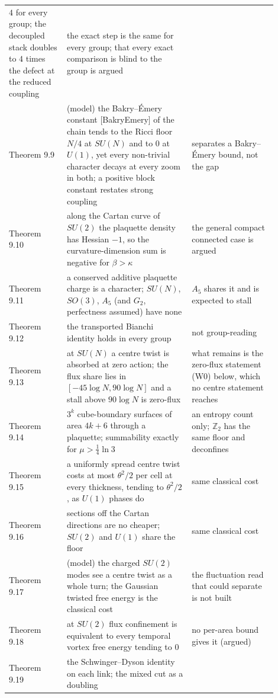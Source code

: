 \documentclass[10pt,letterpaper,twocolumn]{article}
\begin{document}
\begin{center}
{\begin{xtabular}{L{0.194\linewidth}L{0.414\linewidth}L{0.289\linewidth}}
\(4\) for every group; the decoupled stack doubles to \(4\) times the
defect at the reduced coupling & the exact step is the same for every group; that every exact comparison
is blind to the group is argued \\
Theorem 9.9 & (model) the Bakry--Émery constant {[}BakryEmery{]} of the chain tends to
the Ricci floor \(N/4\) at \(SU(N)\) and to \(0\) at \(U(1)\), yet every
non-trivial character decays at every zoom in both; a positive block
constant restates strong coupling & separates a Bakry--Émery bound, not the gap \\
Theorem 9.10 & along the Cartan curve of \(SU(2)\) the plaquette density has Hessian
\(-1\), so the curvature-dimension sum is negative for \(\beta>\kappa\) & the general compact connected case is argued \\
Theorem 9.11 & a conserved additive plaquette charge is a character; \(SU(N)\),
\(SO(3)\), \(A_5\) (and \(G_2\), perfectness assumed) have none & \(A_5\) shares it and is expected to stall \\
Theorem 9.12 & the transported Bianchi identity holds in every group & not group-reading \\
Theorem 9.13 & at \(SU(N)\) a centre twist is absorbed at zero action; the flux share
lies in \([-45\log N,90\log N]\) and a stall above \(90\log N\) is
zero-flux & what remains is the zero-flux statement (W0) below, which no centre
statement reaches \\
Theorem 9.14 & \(3^k\) cube-boundary surfaces of area \(4k+6\) through a plaquette;
summability exactly for \(\mu>\tfrac14\ln3\) & an entropy count only; \(\mathbb Z_2\) has the same floor and deconfines \\
Theorem 9.15 & a uniformly spread centre twist costs at most \(\theta^2/2\) per cell at
every thickness, tending to \(\theta^2/2\), as \(U(1)\) phases do & same classical cost \\
Theorem 9.16 & sections off the Cartan directions are no cheaper; \(SU(2)\) and
\(U(1)\) share the floor & same classical cost \\
Theorem 9.17 & (model) the charged \(SU(2)\) modes see a centre twist as a whole turn;
the Gaussian twisted free energy is the classical cost & the fluctuation read that could separate is not built \\
Theorem 9.18 & at \(SU(2)\) flux confinement is equivalent to every temporal vortex
free energy tending to \(0\) & no per-area bound gives it (argued) \\
Theorem 9.19 & the Schwinger--Dyson identity on each link; the mixed cut as a doubling

\end{xtabular}}
\end{center}
\end{document}
